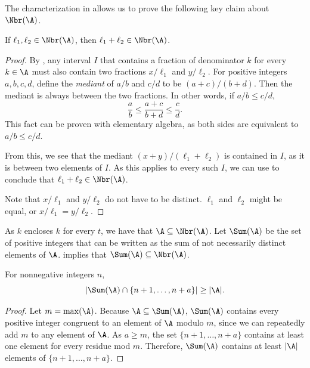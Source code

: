 The characterization in  allows us to prove the following key claim about $\Nbr(\A)$.

\begin{claim}
    \label{claim:sumcondition}
    If $\ell_1,\ell_2\in \Nbr(\A)$, then $\ell_1+\ell_2\in \Nbr(\A)$.
\end{claim}

\begin{proof}
    By , any interval $I$ that contains a fraction of denominator $k$ for every $k\in \A$ must also contain two fractions $x/\ell_1$ and $y/\ell_2$. For positive integers $a,b,c,d$, define the \emph{mediant} of $a/b$ and $c/d$ to be $(a+c)/(b+d)$. Then the mediant is always between the two fractions. In other words, if $a/b\le c/d$,
    \[\frac{a}{b}\le \frac{a+c}{b+d}\le \frac{c}{d}. \]
    This fact can be proven with elementary algebra, as both sides are equivalent to $a/b\le c/d$.
    
    From this, we see that the mediant $(x+y)/(\ell_1+\ell_2)$ is contained in $I$, as it is between two elements of $I$. As this applies to every such $I$, we can use  to conclude that $\ell_1+\ell_2\in \Nbr(\A)$.
    
    Note that $x/\ell_1$ and $y/\ell_2$ do not have to be distinct. $\ell_1$ and $\ell_2$ might be equal, or $x/\ell_1=y/\ell_2$.
\end{proof}

As $k$ encloses $k$ for every $t$, we have that $\A\subseteq \Nbr(\A)$. Let $\Sum(\A)$ be the set of positive integers that can be written as the sum of not necessarily distinct elements of $\A$.  implies that $\Sum(\A)\subseteq \Nbr(\A)$.

\begin{claim}
    For nonnegative integers $n$, \[\lvert\Sum(\A)\cap \{n+1,\dots,n+a\}\rvert\ge |\A|.\]
\end{claim}

\begin{proof}
    Let $m=\max(\A)$. Because $\A\subseteq \Sum(\A)$, $\Sum(\A)$ contains every positive integer congruent to an element of $\A$ modulo $m$, since we can repeatedly add $m$ to any element of $\A$. As $a\ge m$, the set $\{n+1,\dots,n+a\}$ contains at least one element for every residue mod $m$. Therefore, $\Sum(\A)$ contains at least $|\A|$ elements of $\{n+1,\dots,n+a\}$. 
\end{proof}

